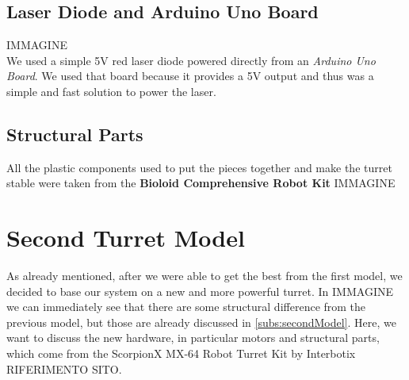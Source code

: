 \subsection{Laser Diode and Arduino Uno Board}
IMMAGINE\\
We used a simple 5V red laser diode powered directly from an \emph{Arduino Uno Board}. We used that board because it provides a 5V output and thus was a simple and fast solution to power the laser.
\subsection{Structural Parts}
All the plastic components used to put the pieces together and make the turret stable were taken from the \textbf{Bioloid Comprehensive Robot Kit} IMMAGINE

\section{Second Turret Model}\label{sec:turret64}
As already mentioned, after we were able to get the best from the first model, we decided to base our system on a new and more powerful turret. In IMMAGINE we can immediately see that there are some structural difference from the previous model, but those are already discussed in \ref{subs:secondModel}. Here, we want to discuss the new hardware, in particular motors and structural parts, which come from the ScorpionX MX-64 Robot Turret Kit by Interbotix RIFERIMENTO SITO.
